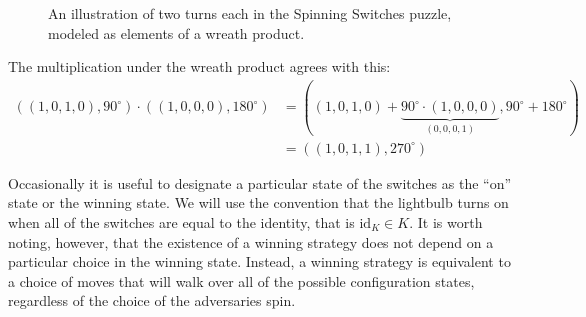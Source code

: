 \begin{example}
\begin{figure}
    \caption[A wreath product interpretation of a spinning switches puzzle.]{
      An illustration of two turns each in the Spinning Switches puzzle,
      modeled as elements of a wreath product.
    }
    \label{fig:WreathProduct}
  \end{figure}

  The multiplication under the wreath product agrees with this: \begin{align*}
    ((1,0,1,0), 90^\circ) \cdot ((1,0,0,0), 180^\circ)
    &= ((1,0,1,0) + \underbrace{90^\circ \cdot (1,0,0,0)}_{(0,0,0,1)}, 90^\circ + 180^\circ) \\
    &= ((1,0,1,1), 270^\circ)
  \end{align*}
\end{example}

Occasionally it is useful to designate a particular state of the switches as the
``on'' state or the winning state. We will use the convention that the lightbulb
turns on when all of the switches are equal to the identity, that is
$\mathrm{id}_K \in K$.
It is worth noting, however, that the existence of a winning strategy does not
depend on a particular choice in the winning state.
Instead, a winning strategy is equivalent to a choice of moves that will walk
over all of the possible configuration states, regardless of the choice of the
adversaries spin.

